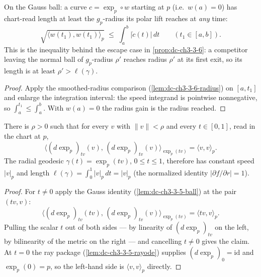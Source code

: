 \begin{lemma}
  \label{lem:dc-ch3-3-6-reach}


  On the Gauss ball: a curve $c=\exp_p\circ w$ starting at $p$ (i.e.\
  $w(a)=0$) has chart-read length at least the $g_p$-radius its polar lift
  reaches at \emph{any} time:
  $$\sqrt{\langle w(t_1),w(t_1)\rangle_p}\;\le\;\int_a^b|\dot c(t)|\,dt
    \qquad(t_1\in[a,b]).$$
  This is the inequality behind the escape case in
  \cref{prop:dc-ch3-3-6}: a competitor leaving the normal ball of
  $g_p$-radius $\rho'$ reaches radius $\rho'$ at its first exit, so its
  length is at least $\rho'>\ell(\gamma)$.
\end{lemma}
\begin{proof}
  \sketch

  Apply the smoothed-radius comparison (\cref{lem:dc-ch3-3-6-radius}) on
  $[a,t_1]$ and enlarge the integration interval: the speed integrand is
  pointwise nonnegative, so $\int_a^{t_1}\le\int_a^b$. With $w(a)=0$ the
  radius gain is the radius reached.
\end{proof}

\begin{lemma}
  \label{lem:dc-ch3-3-6-rayspeed}


  There is $\rho>0$ such that for every $v$ with $\|v\|<\rho$ and every
  $t\in[0,1]$, read in the chart at $p$,
  $$\big\langle(d\exp_p)_{tv}(v),\,(d\exp_p)_{tv}(v)\big\rangle_{\exp_p(tv)}
    =\langle v,v\rangle_p.$$
  The radial geodesic $\gamma(t)=\exp_p(tv)$, $0\le t\le1$, therefore has
  constant speed $|v|_p$ and length
  $\ell(\gamma)=\int_0^1|v|_p\,dt=|v|_p$ (the normalized identity
  $|\partial f/\partial r|=1$).
\end{lemma}
\begin{proof}
  \sketch

  For $t\ne0$ apply the Gauss identity (\cref{lem:dc-ch3-3-5-ball}) at the
  pair $(tv,v)$:
  $$\big\langle(d\exp_p)_{tv}(tv),\,(d\exp_p)_{tv}(v)\big\rangle_{\exp_p(tv)}
    =\langle tv,v\rangle_p.$$
  Pulling the scalar $t$ out of both sides — by linearity of $(d\exp_p)_{tv}$
  on the left, by bilinearity of the metric on the right — and cancelling
  $t\ne0$ gives the claim. At $t=0$ the ray package
  (\cref{lem:dc-ch3-3-5-rayode}) supplies $(d\exp_p)_0=\mathrm{id}$ and
  $\exp_p(0)=p$, so the left-hand side is $\langle v,v\rangle_p$ directly.

\end{proof}

